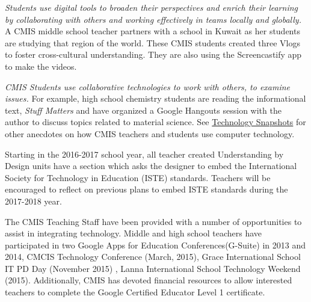 \documentclass{report}
\begin{document}
\begin{findings}
\textit{Students use digital tools to broaden their perspectives and
enrich their learning by collaborating with others and working
effectively in teams locally and globally.} A CMIS middle school teacher partners with a school in Kuwait as her students are studying that region of the world.  These CMIS students  created three Vlogs to foster cross-cultural understanding.  They are also using the Screencastify app to make the videos.

\textit{CMIS Students use collaborative technologies to work with others, to examine issues.} For example, high school chemistry students are reading the informational text, \textit{Stuff Matters} and have organized a Google Hangouts session with the author to discuss topics related to material science. See \href{https://docs.google.com/a/cmis.ac.th/document/d/15hsNNTonRewyDmMCelG2aVxweUJhej15h627tCAQBXg/edit?usp=sharing}{Technology Snapshots} for other anecdotes on how CMIS teachers and students use computer technology. 


Starting in the 2016-2017 school year, all teacher created Understanding by Design units have a section which asks the designer to embed the International Society for Technology in Education (ISTE) standards. Teachers will be encouraged to reflect on previous plans to embed ISTE standards during the 2017-2018 year.  


The CMIS Teaching Staff have been provided with a number of opportunities to assist in integrating technology. Middle and high school teachers have participated in two Google Apps for Education Conferences(G-Suite) in 2013 and 2014, CMCIS Technology Conference (March, 2015), Grace International School IT PD Day (November 2015) , Lanna International School Technology Weekend (2015). Additionally, CMIS has devoted financial resources to allow interested teachers to complete the Google Certified Educator Level 1 certificate. 



\end{findings}
\end{document}
